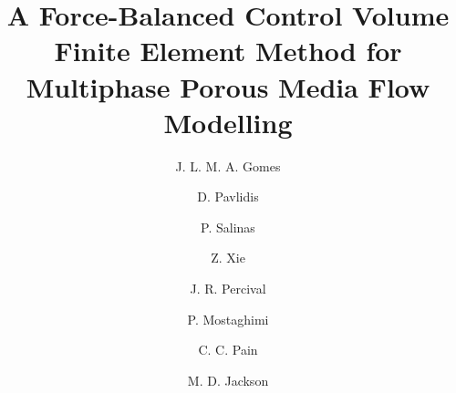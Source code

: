 \documentclass[preprint,authoryear,12pt]{elsarticle}
\begin{document}
\begin{frontmatter}



\title{A Force-Balanced Control Volume Finite Element Method for Multiphase Porous Media Flow Modelling}

\author[UoA,NORMS]{J. L. M. A. Gomes} \author[IC,NORMS]{D. Pavlidis} 
\author[IC,NORMS]{P. Salinas} \author[IC,NORMS]{Z. Xie}
\author[IC]{J. R. Percival} \author[NSW]{P. Mostaghimi} 
\author[IC,NORMS]{C. C. Pain} \author[NORMS]{M. D. Jackson}

\address[UoA]{Environmental and Industrial Fluid Mechanics Group, School of Engineering, University of Aberdeen, UK}
\address[IC]{Applied Modelling and Computation Group, Department of Earth Science and Engineering, Imperial College London, UK}
\address[NSW]{School of Petroleum Engineering, University of New South Wales, Australia}
\address[NORMS]{Novel Reservoir Modelling and Simulation Group, Department of Earth Science and Engineering, Imperial College London, UK}


\end{frontmatter}
\end{document}
